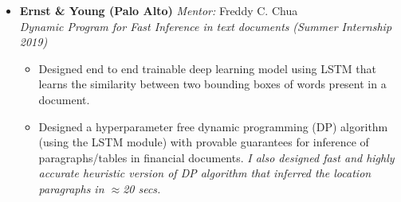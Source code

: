 \documentclass[9pt]{article}
\newenvironment{changemargin}[2]{%
  \begin{list}{}{%
    \setlength{\topsep}{0pt}%
    \setlength{\leftmargin}{0pt}%
    \setlength{\rightmargin}{#2}%
    \setlength{\listparindent}{\parindent}%
    \setlength{\itemindent}{\parindent}%
    \setlength{\parsep}{\parskip}%
  }%
  \item[]}{\end{list}
}
\newenvironment{body} {
	\vspace*{-16pt}
	\begin{changemargin}{-0.25in}{-0.5in}
  }	
	{\end{changemargin}
}
\begin{document}
\begin{body}
\begin{itemize}
        
	  \smallskip
          \item \textbf{Ernst \& Young (Palo Alto)} \hfill{} \textit{Mentor:} Freddy C. Chua\\ \textit{Dynamic Program for Fast Inference in text documents}   \hfill{} \emph{  (Summer Internship 2019)}\\
\begin{itemize}
  \item Designed end to end trainable deep learning model using LSTM that learns the similarity between two bounding boxes of words present in a document.
  \item Designed a hyperparameter free dynamic programming (DP) algorithm (using the LSTM module) with provable guarantees for inference of paragraphs/tables in financial documents. \textit{I also designed fast and highly accurate heuristic version of DP algorithm that inferred the location paragraphs in $\approx$20 secs.}
\end{itemize}          
          

\end{itemize}
\end{body}
\end{document}
